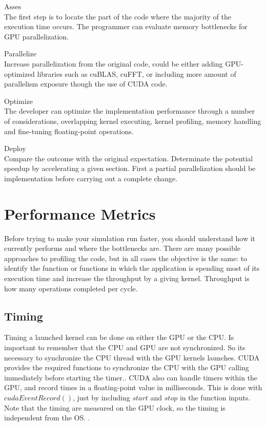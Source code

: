 \begin{description}

 \item{Asses} \hfill \\
 The first step is to locate the part of the code where the majority of the execution time occurs. The programmer can evaluate memory bottlenecks for GPU parallelization.
 \item{Parallelize} \hfill \\
 Increase parallelization from the original code, could be either adding GPU-optimized libraries such as cuBLAS, cuFFT, or including more amount of parallelism exposure though the use of CUDA code.
 \item{Optimize} \hfill \\
The developer can optimize the implementation performance through a number of considerations, overlapping kernel executing, kernel profiling, memory handling and fine-tuning floating-point operations.
 \item{Deploy} \hfill \\
 Compare the outcome with the original expectation. Determinate the potential speedup by accelerating a given section. First a partial parallelization should be implementation before carrying out a complete change.
 \end{description}

\section{Performance Metrics}

Before trying to make your simulation run faster, you should understand how it currently performs and where the bottlenecks are. There are many possible approaches to profiling the code, but in all cases the objective is the same: to identify the function or functions in which the application is spending most of its execution time and increase the throughput by a giving kernel. Throughput is how many operations completed per cycle.

\subsection{Timing}

Timing a launched kernel can be done on either the GPU or the CPU. Is important to remember that the CPU and GPU are not synchronized. So its necessary to synchronize the CPU thread with the GPU kernels launches. CUDA provides the required  functions to synchronize the CPU with the GPU calling immediately before starting the timer.\cite{practices}.  CUDA also can handle timers within the GPU, and record times in a floating-point value in milliseconds. This is done with $cudaEventRecord()$, just by including $start$ and $stop$ in the function inputs. Note that the timing are measured on the GPU clock, so the timing is independent from the OS. \cite{cook}.

